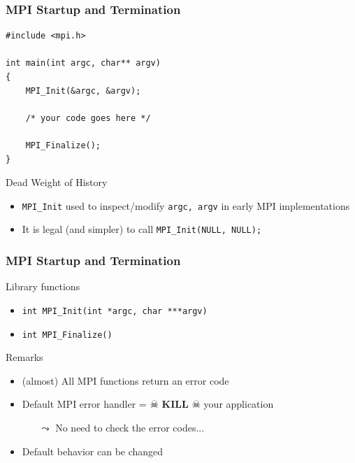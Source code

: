 \documentclass[xcolor={x11names,svgnames,psnames}]{beamer}
\begin{document}
\begin{frame}[fragile=singleslide]
  \frametitle{MPI Startup and Termination}
    
\begin{verbatim}
#include <mpi.h>

int main(int argc, char** argv)
{
    MPI_Init(&argc, &argv);

    /* your code goes here */
    
    MPI_Finalize();
}
\end{verbatim} 

\begin{block}{Dead Weight of History}
  \begin{itemize}
  \item \texttt{MPI_Init} used to inspect/modify \texttt{argc, argv} in early MPI implementations
  \item It is \alert{legal} (and simpler) to call \texttt{MPI_Init(NULL, NULL);}
  \end{itemize}
\end{block}
\end{frame}


\begin{frame}[fragile=singleslide]
  \frametitle{MPI Startup and Termination}

  \begin{exampleblock}{Library functions}
    \begin{itemize}
    \item \texttt{int MPI_Init(int *argc, char ***argv)}
    \item \texttt{int MPI_Finalize()}
    \end{itemize}
  \end{exampleblock}

  \begin{block}{Remarks}
    \begin{itemize}
    \item (almost) All MPI functions return an \alert{error code}
    \item Default MPI error handler = $\skull$ \textbf{KILL} $\skull$ your application
      \begin{itemize}
      \item[$\leadsto$] No need to check the error codes...
      \end{itemize}
    \item Default behavior can be changed
    \end{itemize}
  \end{block}
  
\end{frame}
\end{document}

